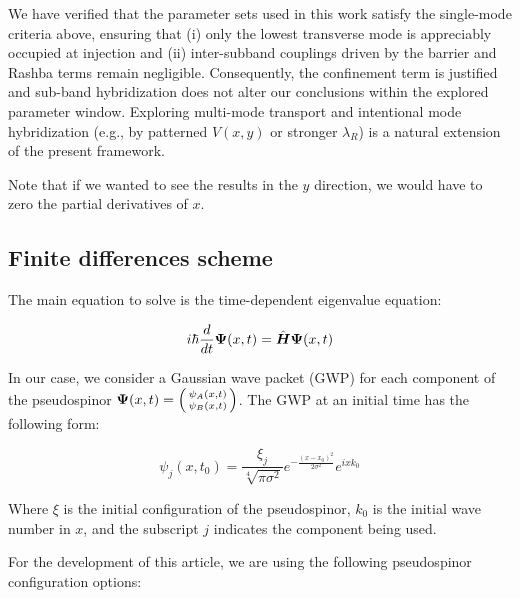 We have verified that the parameter sets used in this work satisfy the single-mode criteria above, ensuring that (i) only the lowest transverse mode is appreciably occupied at injection and (ii) inter-subband couplings driven by the barrier and Rashba terms remain negligible.
Consequently, the confinement term is justified and sub-band hybridization does not alter our conclusions within the explored parameter window.
Exploring multi-mode transport and intentional mode hybridization (e.g., by patterned $V(x,y)$ or stronger $\lambda_R$) is a natural extension of the present framework.

Note that if we wanted to see the results in the $y$ direction, we would have to zero the partial derivatives of $x$.

\subsection{Finite differences scheme}\label{subsec:finite-differences-scheme}

The main equation to solve is the time-dependent eigenvalue equation:

\begin{equation}
    \label{eq:schrodingerTimeDependent}
    i\hbar \frac{d}{dt}\mbox{\boldmath $\Psi$}(x,t) = \hat{\mbox{\boldmath $H$}}\mbox{\boldmath $\Psi$}(x,t)
\end{equation}

In our case, we consider a Gaussian wave packet (GWP) for each component of the pseudospinor $\bn{\Psi}(x,t)=\begin{psmallmatrix*}
\psi_A(x,t)\\\psi_B(x,t)
\end{psmallmatrix*}$.
The GWP at an initial time has the following form:

\begin{equation}
    \label{eq:GWP}
    \psi_j(x,t_0)=\frac{\xi_j}{\sqrt[4]{\pi\sigma^2}}e^{-\frac{(x-x_0)^2}{2\sigma^2}}e^{ixk_0}
\end{equation}

\noindent Where $\xi$ is the initial configuration of the pseudospinor, $k_0$ is the initial wave number in $x$, and the subscript $j$ indicates the component being used.

For the development of this article, we are using the following pseudospinor configuration options:

